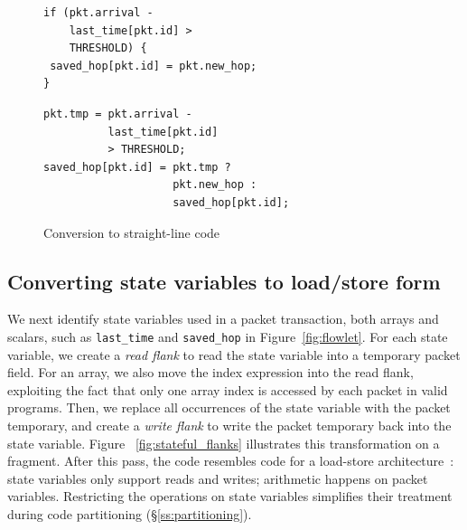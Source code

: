 \begin{figure}[!t]
  \begin{minipage}{0.47\textwidth}
  \begin{small}
  \begin{lstlisting}[style=customc]
if (pkt.arrival -
    last_time[pkt.id] >
    THRESHOLD) {
 saved_hop[pkt.id] = pkt.new_hop;
}
  \end{lstlisting}
  \end{small}
  \end{minipage}
  \begin{minipage}{0.53\textwidth}
  \begin{small}
  \begin{lstlisting}[style=customc]
pkt.tmp = pkt.arrival -
          last_time[pkt.id]
          > THRESHOLD;
saved_hop[pkt.id] = pkt.tmp ?
                    pkt.new_hop :
                    saved_hop[pkt.id];
  \end{lstlisting}
  \end{small}
  \end{minipage}
\caption{Conversion to straight-line code}
\label{fig:if_convert}
\end{figure}
\subsection{Converting state variables to load/store form}

We next identify state variables used in a packet transaction, both arrays and
scalars, such as \texttt{last\_time} and \texttt{saved\_hop} in
Figure~\ref{fig:flowlet}. For each state variable, we create a \textit{read
flank} to read the state variable into a temporary packet field. For an array,
we also move the index expression into the read flank, exploiting the fact that
only one array index is accessed by each packet in valid \pktlanguage
programs.  Then, we replace all occurrences of the state variable with the
packet temporary, and create a \textit{write flank} to write the packet
temporary back into the state variable.  Figure ~\ref{fig:stateful_flanks}
illustrates this transformation on a fragment.  After this pass, the code
resembles code for a load-store architecture~\cite{load_store}: state variables
only support reads and writes; arithmetic happens on packet variables.
Restricting the operations on state variables simplifies their treatment
during code partitioning (\S\ref{ss:partitioning}).


